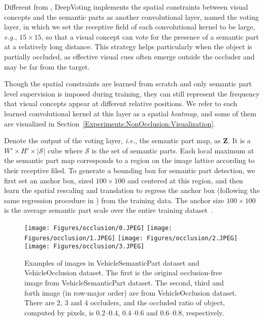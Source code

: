 \documentclass[10pt,twocolumn,letterpaper]{article}
\begin{document}
  Different from \cite{wang2017detecting}, DeepVoting implements the spatial constraints between visual concepts and the semantic parts as another convolutional layer, named the voting layer, in which we set the receptive field of each convolutional kernel to be large, {\em e.g.}, $15\times15$, so that a visual concept can vote for the presence of a semantic part at a relatively long distance. This strategy helps particularly when the object is partially occluded, as effective visual cues often emerge outside the occluder and may be far from the target.

  Though the spatial constraints are learned from scratch and only semantic part level supervision is imposed during training, they can still represent the frequency that  visual concepts appear at different relative positions. We refer to each learned convolutional kernel at this layer as a spatial {\em heatmap}, and some of them are visualized in Section~\ref{Experiments:NonOcclusion:Visualization}.

  Denote the output of the voting layer, {\em i.e.}, the semantic part map, as $\mathbf{Z}$. It is a $W'\times H'\times\left|\mathcal{S}\right|$ cube where $\mathcal{S}$ is the set of semantic parts. Each local maximum at the semantic part map corresponds to a region on the image lattice according to their receptive filed. To generate a bounding box for semantic part detection, we first set an anchor box, sized $100\times100$ and centered at this region, and then learn the spatial rescaling and translation to regress the anchor box (following the same regression procedure in \cite{Girshick_2015_Fast}) from the training data. The anchor size $100\times100$ is the average semantic part scale over the entire training dataset~\cite{wang2017detecting}.

  \begin{figure*}[t!]
  \centering
  \texttt{[image: Figures/occlusion/0.JPEG]} \hfill
  \texttt{[image: Figures/occlusion/1.JPEG]} \hfill
  \texttt{[image: Figures/occlusion/2.JPEG]} \hfill
  \texttt{[image: Figures/occlusion/3.JPEG]}
  \caption{
  Examples of images in VehicleSemanticPart dataset and VehicleOcclusion dataset. The first is the original occlusion-free image from VehicleSemanticPart dataset. The second, third and forth image (in row-major order) are from VehicleOcclusion dataset. There are $2$, $3$ and $4$ occluders, and the occluded ratio of object, computed by pixels, is $0.2$--$0.4$, $0.4$--$0.6$ and $0.6$--$0.8$, respectively.
  }
  \label{Fig:Occlusion}
  \end{figure*}
\end{document}

